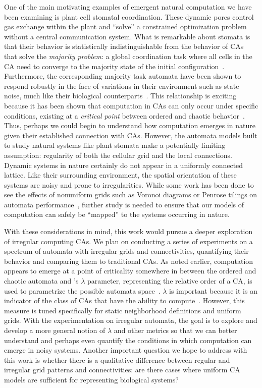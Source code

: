 \documentclass[a4paper,11pt]{report}
\begin{document}
One of the main motivating examples of emergent natural computation we have been examining is plant cell stomatal coordination. These dynamic pores control gas exchange within the plant and ``solve'' a constrained optimization problem without a central communication system. What is remarkable about stomata is that their behavior is statistically indistinguishable from the behavior of CAs that solve the \textit{majority problem}: a global coordination task where all cells in the CA need to converge to the majority state of the initial  configuration~\cite{mo07,pe04, we11}. Furthermore, the corresponding majority task automata have been shown to respond robustly in the face of variations in their environment such as state noise, much like their biological counterparts~\cite{me07}. This relationship is exciting because it has been shown that computation in CAs can only occur under specific conditions, existing at a \textit{critical point} between ordered and chaotic behavior~\cite{la90, wf86}. Thus, perhaps we could begin to understand how computation emerges in nature given their established connection with CAs. However, the automata models built to study natural systems like plant stomata make a potentially limiting assumption: regularity of both the cellular grid and the local connections. Dynamic systems in nature certainly do not appear in a uniformly connected lattice. Like their surrounding environment, the spatial orientation of these systems are noisy and prone to irregularities. While some work has been done to see the effects of nonuniform grids such as Voronoi diagrams or Penrose tilings on automata performance~\cite{ca06,fl01,hi05}, further study is needed to ensure that our models of computation can safely be ``mapped'' to the systems occurring in nature.

With these considerations in mind, this work would pursue a deeper exploration of irregular computing CAs. We plan on conducting a series of experiments on a spectrum of automata with irregular grids and connectivities, quantifying their behavior and comparing them to traditional CAs. As noted earlier, computation appears to emerge at a point of criticality somewhere in between the ordered and chaotic automata and \citeauthor{la90}'s $\lambda$ parameter, representing the relative order of a CA, is used to parametrize the possible automata space~\cite{la90}. $\lambda$ is important because it is an indicator of the class of CAs that have the ability to compute~\cite{wo90}. However, this measure is tuned specifically for static neighborhood definitions and uniform grids. With the experimentation on irregular automata, the goal is to explore and develop a more general notion of $\lambda$ and other metrics so that we can better understand and perhaps even quantify the conditions in which computation can emerge in noisy systems. Another important question we hope to address with this work is whether there is a qualitative difference between regular and irregular grid patterns and connectivities: are there cases where uniform CA models are sufficient for representing biological systems? 
\end{document}
